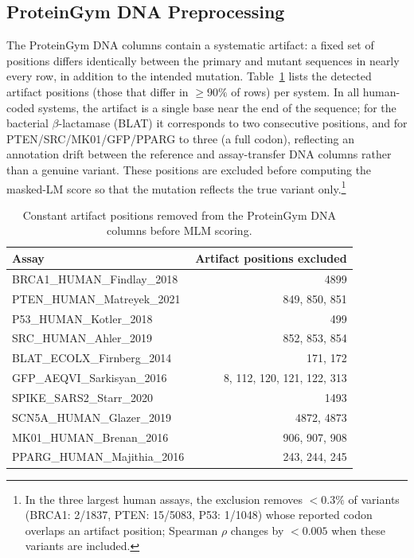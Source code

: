 \documentclass[9pt]{article}
\begin{document}
\subsection{ProteinGym DNA Preprocessing}

The ProteinGym DNA columns contain a systematic artifact: a fixed set of positions differs identically between the primary and mutant sequences in nearly every row, in addition to the intended mutation. Table~\ref{tab:artifact} lists the detected artifact positions (those that differ in $\geq 90\%$ of rows) per system. In all human-coded systems, the artifact is a single base near the end of the sequence; for the bacterial $\beta$-lactamase (BLAT) it corresponds to two consecutive positions, and for PTEN/SRC/MK01/GFP/PPARG to three (a full codon), reflecting an annotation drift between the reference and assay-transfer DNA columns rather than a genuine variant. These positions are excluded before computing the masked-LM score so that the mutation reflects the true variant only.\footnote{In the three largest human assays, the exclusion removes $<0.3\%$ of variants (BRCA1: 2/1837, PTEN: 15/5083, P53: 1/1048) whose reported codon overlaps an artifact position; Spearman $\rho$ changes by $<0.005$ when these variants are included.}

\begin{table}[h]
\centering
\caption{Constant artifact positions removed from the ProteinGym DNA columns before MLM scoring.}
\label{tab:artifact}
\small
\begin{tabular}{lr}
\toprule
\textbf{Assay} & \textbf{Artifact positions excluded} \\
\midrule
BRCA1\_HUMAN\_Findlay\_2018 & 4899 \\
PTEN\_HUMAN\_Matreyek\_2021 & 849, 850, 851 \\
P53\_HUMAN\_Kotler\_2018 & 499 \\
SRC\_HUMAN\_Ahler\_2019 & 852, 853, 854 \\
BLAT\_ECOLX\_Firnberg\_2014 & 171, 172 \\
GFP\_AEQVI\_Sarkisyan\_2016 & 8, 112, 120, 121, 122, 313 \\
SPIKE\_SARS2\_Starr\_2020 & 1493 \\
SCN5A\_HUMAN\_Glazer\_2019 & 4872, 4873 \\
MK01\_HUMAN\_Brenan\_2016 & 906, 907, 908 \\
PPARG\_HUMAN\_Majithia\_2016 & 243, 244, 245 \\
\bottomrule
\end{tabular}
\end{table}
\end{document}
